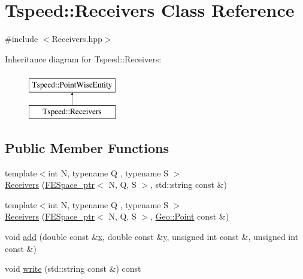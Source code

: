 \hypertarget{classTspeed_1_1Receivers}{\section{Tspeed\-:\-:Receivers Class Reference}
\label{classTspeed_1_1Receivers}
}


{\ttfamily \#include $<$Receivers.\-hpp$>$}

Inheritance diagram for Tspeed\-:\-:Receivers\-:\begin{figure}[H]
\begin{center}
\leavevmode
\includegraphics[height=2.000000cm]{classTspeed_1_1Receivers}
\end{center}
\end{figure}
\subsection*{Public Member Functions}
\begin{DoxyCompactItemize}
\item 
{\footnotesize template$<$int N, typename Q , typename S $>$ }\\\hyperlink{classTspeed_1_1Receivers_a54d8209b84f325fbf6470318cd961e76}{Receivers} (\hyperlink{namespaceTspeed_a05fcb57094666c8f5ab1e90d1a6fecf8}{F\-E\-Space\-\_\-ptr}$<$ N, Q, S $>$, std\-::string const \&)
\item 
{\footnotesize template$<$int N, typename Q , typename S $>$ }\\\hyperlink{classTspeed_1_1Receivers_a70779bee95d94ef96f416deabc4f42c8}{Receivers} (\hyperlink{namespaceTspeed_a05fcb57094666c8f5ab1e90d1a6fecf8}{F\-E\-Space\-\_\-ptr}$<$ N, Q, S $>$, \hyperlink{classTspeed_1_1Geo_1_1Point}{Geo\-::\-Point} const \&)
\item 
void \hyperlink{classTspeed_1_1Receivers_a6048d3823edb7ed2481ed8c50fedca10}{add} (double const \&\hyperlink{vtk__mesh__out_8m_ace4b66138f2e64832c951b1ba9ce24cc}{x}, double const \&\hyperlink{vtk__mesh__out_8m_a2fb1c5cf58867b5bbc9a1b145a86f3a0}{y}, unsigned int const \&, unsigned int const \&)
\item 
void \hyperlink{classTspeed_1_1Receivers_acd4b059932051140166eb0592fb0223a}{write} (std\-::string const \&) const 
\end{DoxyCompactItemize}
